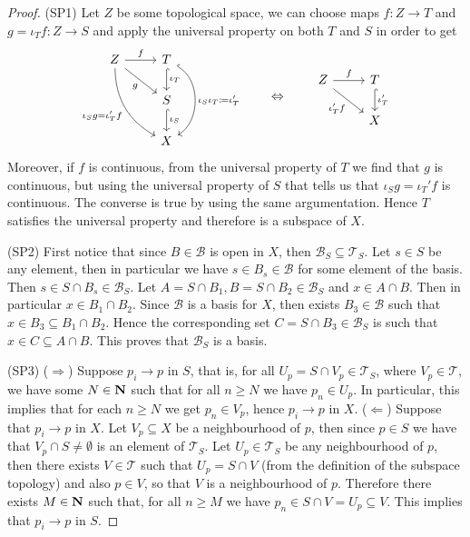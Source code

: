 \begin{proof}
(SP1) Let \(Z\) be some topological space, we can choose maps \(f: Z \to T\)
and \(g = \iota_T  f : Z \to S\) and apply the universal property on both
\(T\) and \(S\) in order to get
\[
  \begin{tikzcd}
    Z \ar[r,"f"]
    \ar[rd, swap, "g"]
    \ar[rdd, swap, bend right,
    "\iota_S  g = \iota_T'  f"]
      &T \ar[d, hook, "\iota_T"]
      \ar[dd, hook, bend left = 60, "\iota_S  \iota_T \coloneq \iota_T'"]\\
      &S \ar[d, hook, "\iota_S"] \\
      &X
  \end{tikzcd}
  \qquad \Leftrightarrow \qquad
  \begin{tikzcd}
    Z \ar[dr, swap, "\iota_T'  f"] \ar[r, "f"]
      &T \ar[d, hook, "\iota_T'"] \\
      &X
  \end{tikzcd}
\]
Moreover, if \(f\) is continuous, from the universal property of \(T\) we find
that \(g\) is continuous, but using the universal property of \(S\) that tells
us that \(\iota_S  g = \iota_T'  f\) is continuous. The converse is
true by using the same argumentation. Hence \(T\) satisfies the universal
property and therefore is a subspace of \(X\).

(SP2) First notice that since \(B \in \mathcal B\) is open in \(X\), then
\(\mathcal B_S \subseteq \mathcal T_S\). Let \(s \in S\) be any element, then
in particular we have \(s \in B_s \in \mathcal B\) for some element of the
basis. Then \(s \in S \cap B_s \in \mathcal B_S\). Let \(A = S \cap B_1, B = S
\cap B_2 \in \mathcal B_S\) and \(x \in A \cap B\). Then in particular \(x \in
B_1 \cap B_2\). Since \(\mathcal B\) is a basis for \(X\), then exists \(B_3
\in \mathcal B\) such that \(x \in B_3 \subseteq B_1 \cap B_2\). Hence the
corresponding set \(C = S \cap B_3 \in \mathcal B_S\) is such that \(x \in C
\subseteq A \cap B\). This proves that \(\mathcal B_S\) is a basis.

(SP3) (\(\Rightarrow\)) Suppose \(p_i \to p\) in \(S\), that is, for all \(U_p =
S \cap V_p \in \mathcal T_S\), where \(V_p \in \mathcal T\), we have some \(N
\in \mathbf{N}\) such that for all \(n \geq N\) we have \(p_n \in U_p\). In particular,
this implies that for each \(n \geq N\) we get \(p_n \in V_p\), hence \(p_i \to
p\) in \(X\).
(\(\Leftarrow\)) Suppose that \(p_i \to p\) in \(X\). Let \(V_p \subseteq X\)
be a neighbourhood of \(p\), then since \(p \in S\) we have that \(V_p \cap S
\neq \emptyset\) is an element of \(\mathcal T_S\). Let \(U_p \in
\mathcal T_S\) be any neighbourhood of \(p\), then there exists \(V \in
\mathcal T\) such that \(U_p = S \cap V\) (from the definition of the subspace
topology) and also \(p \in V\), so that \(V\) is a neighbourhood of \(p\).
Therefore there exists \(M \in \mathbf{N}\) such that, for all \(n \geq M\) we have
\(p_n \in S \cap V = U_p \subseteq V\). This implies that \(p_i \to p\) in
\(S\).


\end{proof}
